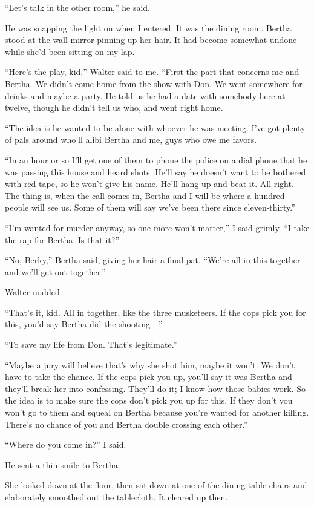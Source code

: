 \documentclass{novel}
\begin{document}
“Let’s talk in the other room,” he said.

\scenestars

He was snapping the light on when I entered. It was the dining room. Bertha stood at the wall mirror pinning up her hair. It had become somewhat undone while she’d been sitting on my lap.

“Here’s the play, kid,” Walter said to me. “First the part that concerns me and Bertha. We didn’t come home from the show with Don. We went somewhere for drinks and maybe a party. He told us he had a date with somebody here at twelve, though he didn’t tell us who, and went right home. 

“The idea is he wanted to be alone with whoever he was meeting. I’ve got plenty of pals around who’ll alibi Bertha and me, guys who owe me favors. 

“In an hour or so I’ll get one of them to phone the police on a dial phone that he was passing this house and heard shots. He’ll say he doesn’t want to be bothered with red tape, so he won’t give his name. He’ll hang up and beat it. All right. The thing is, when the call comes in, Bertha and I will be where a hundred people will see us. Some of them will say we’ve been there since eleven-thirty.”

“I’m wanted for murder anyway, so one more won’t matter,” I said grimly. “I take the rap for Bertha. Is that it?”

“No, Berky,” Bertha said, giving her hair a final pat. “We’re all in this together and we’ll get out together.” 

Walter nodded. 

“That’s it, kid. All in together, like the three musketeers. If the cops pick you for this, you’d say Bertha did the shooting—”

“To save my life from Don. That’s legitimate.”

“Maybe a jury will believe that’s why she shot him, maybe it won’t. We don’t have to take the chance. If the cops pick you up, you’ll say it was Bertha and they’ll break her into confessing. They’ll do it; I know how those babies work. So the idea is to make sure the cops don’t pick you up for this. If they don’t you won’t go to them and squeal on Bertha because you’re wanted for another killing. There’s no chance of you and Bertha double crossing each other.”

“Where do you come in?” I said.

He sent a thin smile to Bertha. 

She looked down at the floor, then sat down at one of the dining table chairs and elaborately smoothed out the tablecloth. It cleared up then. 
\end{document}
